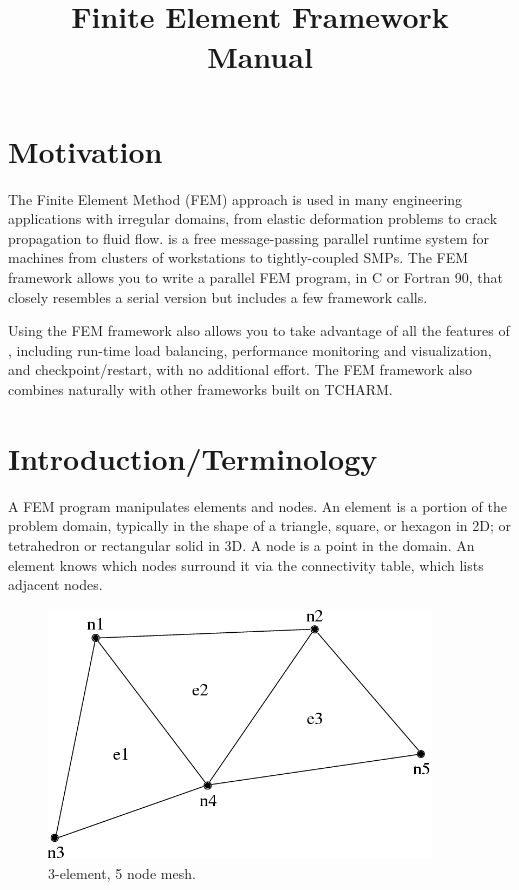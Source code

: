 \documentclass[10pt]{article}
\title{\charmpp\\ Finite Element Framework\\ Manual}
\begin{document}
\maketitle

\section{Motivation}

The Finite Element Method (FEM) approach is used in many engineering
applications with irregular domains, from elastic deformation problems to
crack propagation to fluid flow.  \charmpp{} is a free message-passing parallel
runtime system for machines from clusters of workstations to tightly-coupled
SMPs.  The \charmpp{} FEM framework allows you to write a parallel FEM program,
in C or Fortran 90, that closely resembles a serial version but includes
a few framework calls.

Using the FEM framework also allows you to take advantage of all the
features of \charmpp, including run-time load balancing,  performance
monitoring and visualization, and checkpoint/restart, with no additional
effort. The FEM framework also combines naturally with other \charmpp
frameworks built on TCHARM.


\section{Introduction/Terminology}

A FEM program manipulates elements and nodes. An element is a portion of
the problem domain, typically in the shape of a triangle, square, or hexagon
in 2D; or tetrahedron or rectangular solid in 3D.  A node is a point in the
domain.  An element knows which nodes surround it via the connectivity
table, which lists adjacent nodes.

\begin{figure}[h]
\begin{center}
\includegraphics[width=4in]{simple_mesh}
\end{center}
\caption{3-element, 5 node mesh.}
\label{fig:simplemesh}
\end{figure}
\end{document}
